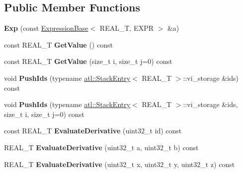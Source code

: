 \subsection*{Public Member Functions}
\begin{DoxyCompactItemize}
\item 
\hypertarget{structatl_1_1_exp_a4fc8871d953fd609370164f42929d736}{{\bfseries Exp} (const \hyperlink{structatl_1_1_expression_base}{Expression\+Base}$<$ R\+E\+A\+L\+\_\+\+T, E\+X\+P\+R $>$ \&a)}\label{structatl_1_1_exp_a4fc8871d953fd609370164f42929d736}

\item 
\hypertarget{structatl_1_1_exp_a4ad5a9a1666163b6e66ecf4865b30e7e}{const R\+E\+A\+L\+\_\+\+T {\bfseries Get\+Value} () const }\label{structatl_1_1_exp_a4ad5a9a1666163b6e66ecf4865b30e7e}

\item 
\hypertarget{structatl_1_1_exp_afbc8958aa71585d44bc767a6b2f62e4f}{const R\+E\+A\+L\+\_\+\+T {\bfseries Get\+Value} (size\+\_\+t i, size\+\_\+t j=0) const }\label{structatl_1_1_exp_afbc8958aa71585d44bc767a6b2f62e4f}

\item 
\hypertarget{structatl_1_1_exp_ac4029416d216ad718ffbb6365f0748f4}{void {\bfseries Push\+Ids} (typename \hyperlink{structatl_1_1_stack_entry}{atl\+::\+Stack\+Entry}$<$ R\+E\+A\+L\+\_\+\+T $>$\+::vi\+\_\+storage \&ids) const }\label{structatl_1_1_exp_ac4029416d216ad718ffbb6365f0748f4}

\item 
\hypertarget{structatl_1_1_exp_a76212b4f0346075224dada55da989326}{void {\bfseries Push\+Ids} (typename \hyperlink{structatl_1_1_stack_entry}{atl\+::\+Stack\+Entry}$<$ R\+E\+A\+L\+\_\+\+T $>$\+::vi\+\_\+storage \&ids, size\+\_\+t i, size\+\_\+t j=0) const }\label{structatl_1_1_exp_a76212b4f0346075224dada55da989326}

\item 
\hypertarget{structatl_1_1_exp_a5dfc68001a2b0ffb7d8a8c6bb08abbec}{const R\+E\+A\+L\+\_\+\+T {\bfseries Evaluate\+Derivative} (uint32\+\_\+t id) const }\label{structatl_1_1_exp_a5dfc68001a2b0ffb7d8a8c6bb08abbec}

\item 
\hypertarget{structatl_1_1_exp_a606ff4e4a554894c19418cbd3cd6b4b3}{R\+E\+A\+L\+\_\+\+T {\bfseries Evaluate\+Derivative} (uint32\+\_\+t a, uint32\+\_\+t b) const }\label{structatl_1_1_exp_a606ff4e4a554894c19418cbd3cd6b4b3}

\item 
\hypertarget{structatl_1_1_exp_ad672b4534d729dbaa1a9a7dd22329289}{R\+E\+A\+L\+\_\+\+T {\bfseries Evaluate\+Derivative} (uint32\+\_\+t x, uint32\+\_\+t y, uint32\+\_\+t z) const }\label{structatl_1_1_exp_ad672b4534d729dbaa1a9a7dd22329289}


\end{DoxyCompactItemize}
